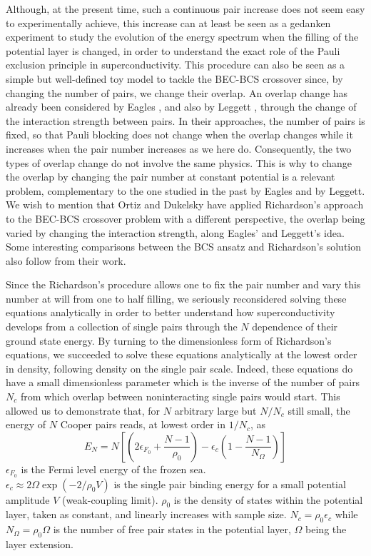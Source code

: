 \documentclass[epj]{svjour}
\begin{document}
Although, at the present time, such a continuous pair increase
does not seem easy to experimentally achieve, this increase can at least be seen as a 
gedanken experiment to study the evolution of the energy spectrum when
the filling of the potential layer is changed, in order to understand the exact role of the Pauli
exclusion principle in superconductivity. 
This procedure can also be
seen as a simple but well-defined toy model to tackle the BEC-BCS crossover
since, by changing the number of pairs, we change their overlap. 
An overlap change has already been considered by Eagles \cite{Eagle}, 
and also by Leggett \cite{LeggettCrossover}, through the change of the interaction strength between pairs. In their approaches, the number of pairs is fixed, so that Pauli blocking does not change when the overlap changes while it increases when the pair number increases as we here do. Consequently, the two types of overlap change do not involve the same physics. This is why to change the overlap by changing the pair number at constant potential is a relevant problem, complementary to the one studied in the past by Eagles and by Leggett. We wish to mention that Ortiz and Dukelsky have applied Richardson's approach to the BEC-BCS crossover problem with a different perspective, the overlap being varied by changing the interaction strength\cite{crossoverRich}, along Eagles' and  Leggett's idea.  Some interesting comparisons between the BCS ansatz and Richardson's solution also follow from their work.  


Since the Richardson's procedure allows one to fix the pair number and vary 
this number at will from one to half filling, we seriously reconsidered 
solving these equations analytically in order to better understand how superconductivity develops from a collection of single pairs through the $N$ dependence of their ground state energy. By turning to the dimensionless form of Richardson's equations, we succeeded to solve these equations analytically at the lowest order in density, following density on the single pair scale\cite{moth}. 
Indeed, these equations do have a small dimensionless parameter which is the inverse of the number of pairs $N_{c}$ from which overlap between noninteracting single pairs would start. 
This allowed us to demonstrate that, for $N$ arbitrary large but $N/N_{c}$ still small, 
the energy of $N$ Cooper pairs reads, at lowest order in $1/ N_{c}$, as
\begin{equation}
E_{N}= N\left[ \left( 2\epsilon _{F_{0}}+\frac{N-1}{\rho _{0}}%
\right)-\epsilon _{c}\left( 1-\frac{N-1}{N_{\Omega }}\right) \right]
\label{eq:eN}
\end{equation}%
$\epsilon _{F_{0}}$ is the Fermi level energy of the frozen sea.  \\$\epsilon _{c}\approx
2\Omega \exp \left( -2/\rho _{0}V\right) $ is the single pair binding
energy for a small potential amplitude $V$ (weak-coupling limit). $\rho
_{0} $ is the density of states within the potential
layer, taken as constant, and linearly increases with sample size. $N_{c }=\rho _{0}\epsilon _{c} $ while $N_{\Omega }=\rho _{0}\Omega $ is the number of free pair states in the potential
layer, $\Omega $ being the layer extension.
\end{document}
